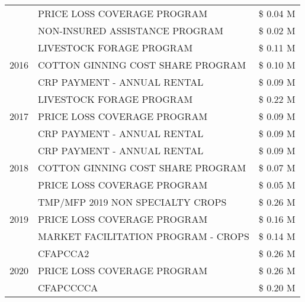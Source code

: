 \begin{tabular}{llr}
 & PRICE LOSS COVERAGE PROGRAM & \$ 0.04 M \\
 & NON-INSURED ASSISTANCE PROGRAM & \$ 0.02 M \\
\cline{1-3}
\multirow[t]{3}{*}{2016} & LIVESTOCK FORAGE PROGRAM                      & \$ 0.11 M \\
 & COTTON GINNING COST SHARE PROGRAM             & \$ 0.10 M \\
 & CRP PAYMENT - ANNUAL RENTAL                   & \$ 0.09 M \\
\cline{1-3}
\multirow[t]{3}{*}{2017} & LIVESTOCK FORAGE PROGRAM & \$ 0.22 M \\
 & PRICE LOSS COVERAGE PROGRAM & \$ 0.09 M \\
 & CRP PAYMENT - ANNUAL RENTAL & \$ 0.09 M \\
\cline{1-3}
\multirow[t]{3}{*}{2018} & CRP PAYMENT - ANNUAL RENTAL & \$ 0.09 M \\
 & COTTON GINNING COST SHARE PROGRAM & \$ 0.07 M \\
 & PRICE LOSS COVERAGE PROGRAM & \$ 0.05 M \\
\cline{1-3}
\multirow[t]{3}{*}{2019} & TMP/MFP 2019 NON SPECIALTY CROPS & \$ 0.26 M \\
 & PRICE LOSS COVERAGE PROGRAM & \$ 0.16 M \\
 & MARKET FACILITATION PROGRAM - CROPS & \$ 0.14 M \\
\cline{1-3}
\multirow[t]{3}{*}{2020} & CFAPCCA2 & \$ 0.26 M \\
 & PRICE LOSS COVERAGE PROGRAM & \$ 0.26 M \\
 & CFAPCCCCA & \$ 0.20 M \\
\cline{1-3}
\bottomrule
\end{tabular}
